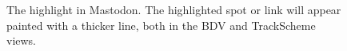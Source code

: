 \begin{figure}
    \hfill
    
    \caption{The highlight in Mastodon. The highlighted spot or link will appear painted with a thicker line, both in the BDV and TrackScheme views.}
    \label{fig:Highlight}
\end{figure}  





